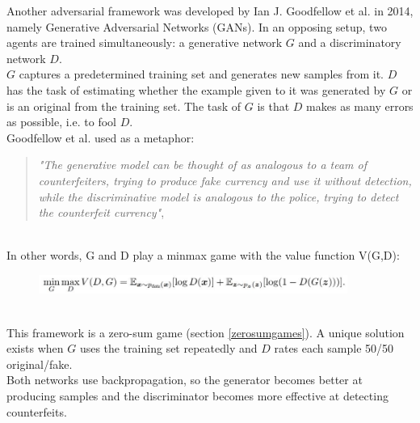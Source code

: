 Another adversarial framework was developed by Ian J. Goodfellow et al. \cite{gansgoodfellow2014generative} in 2014, namely Generative Adversarial Networks (GANs). 
In an opposing setup, two agents are trained simultaneously: a generative network $G$ and a discriminatory network $D$. \\
$G$ captures a predetermined training set and generates new samples from it. $D$ has the task of estimating whether the example given to it was generated by $G$ or is an original from the training set. The task of $G$ is that $D$ makes as many errors as possible, i.e. to fool $D$.\\
Goodfellow et al. used as a metaphor:
\begin{quote}
\textit{"The generative model can be thought of as analogous to a team of counterfeiters, trying to produce fake currency and use it without detection, while the discriminative model is analogous to the police, trying to detect the counterfeit currency"}, \cite{gansgoodfellow2014generative}
\end{quote}{}
\\
In other words, G and D play a minmax game with the value function V(G,D):
\\

\begin{figure}[H]
  \centering
    \includegraphics[width=0.9\textwidth]{adversarial_learning/images/minmax_gan.JPG}
    \label{fig:sumo}
\end{figure}
\\
This framework is a zero-sum game (section \ref{zerosumgames}). A unique solution exists when $G$ uses the training set repeatedly and $D$ rates each sample 50/50 original/fake.\\
Both networks use backpropagation, so the generator becomes better at producing samples and the discriminator becomes more effective at detecting counterfeits.
\\
